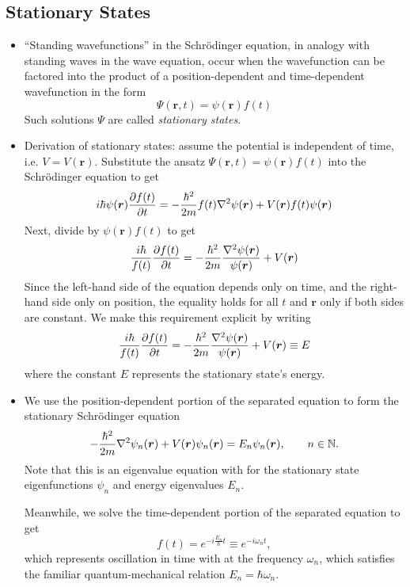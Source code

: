 \documentclass[11pt, a4paper]{article}
\newcommand{\Schro}{Schr\"{o}dinger\xspace}
\renewcommand{\vec}[1]{\bm{#1}} %
\renewcommand{\r}{\vec{r}}  %
\newcommand{\p}{\psi}  %
\renewcommand{\P}{\Psi}  %
\begin{document}
\subsection{Stationary States}
\begin{itemize}
	\item ``Standing wavefunctions'' in the \Schro equation, in analogy with standing waves in the wave  equation, occur when the wavefunction can be factored into the product of a position-dependent and time-dependent wavefunction in the form
	\begin{equation*}
		\P(\r, t) = \p(\r)f(t)
	\end{equation*}
	Such solutions $ \P $ are called \textit{stationary states}. 
	
	\item Derivation of stationary states: assume the potential is independent of time, i.e. $ V = V(\r) $. Substitute the ansatz $ \P(\r, t) = \p(\r)f(t) $ into the \Schro equation to get
	\begin{equation*}
		i \hbar \p(\r) \pdv{f(t)}{t} = - \frac{\hbar^{2}}{2m} f(t) \laplacian \p(\r) + V(\r)f(t)\p(\r)
	\end{equation*}
	Next, divide by $ \p(\r)f(t) $ to get
	\begin{equation*}
		\frac{i \hbar}{f(t)} \pdv{f(t)}{t} = - \frac{\hbar^{2}}{2m}\frac{\laplacian \p(\r)}{\p(\r)} + V(\r) 
	\end{equation*}
	Since the left-hand side of the equation depends only on time, and the right-hand side only on position, the equality holds for all $ t $ and $ \r $ only if both sides are constant. We make this requirement explicit by writing
	\begin{equation*}
		\frac{i \hbar}{f(t)} \pdv{f(t)}{t} = - \frac{\hbar^{2}}{2m}\frac{\laplacian \p(\r)}{\p(\r)} + V(\r) \equiv E
	\end{equation*}
	where the constant $ E $ represents the stationary state's energy.
	
	\item We use the position-dependent portion of the separated equation to form the stationary \Schro equation
	\begin{equation*}
		-\frac{\hbar^{2}}{2m}\laplacian \p_{n}(\r) + V(\r) \p_{n}(\r) = E_{n}\p_{n}(\r), \qquad n \in \mathbb{N}.
	\end{equation*}
	Note that this is an eigenvalue equation with for the stationary state eigenfunctions $ \p_{n} $ and energy eigenvalues $ E_{n} $.
	
	Meanwhile, we solve the time-dependent portion of the separated equation to get
	\begin{equation*}
		f(t) = e^{-i\frac{E_{n}}{\hbar}t} \equiv e^{-i\omega_{n}t},
	\end{equation*}
	which represents oscillation in time with at the frequency $ \omega_{n} $, which satisfies the familiar quantum-mechanical relation $ E_{n} = \hbar \omega_{n} $. 
	

\end{itemize}
\end{document}
